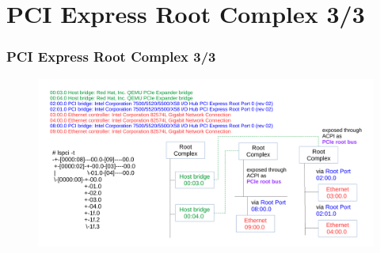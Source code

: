 \documentclass[aspectratio=169]{beamer}
\begin{document}
\section{PCI Express Root Complex 3/3}
\begin{frame}
\frametitle{PCI Express Root Complex 3/3}
\begin{figure}
\includegraphics[width=1.0\linewidth]{figures/root-complex.pdf}
\end{figure}
\end{frame}

\end{document}
